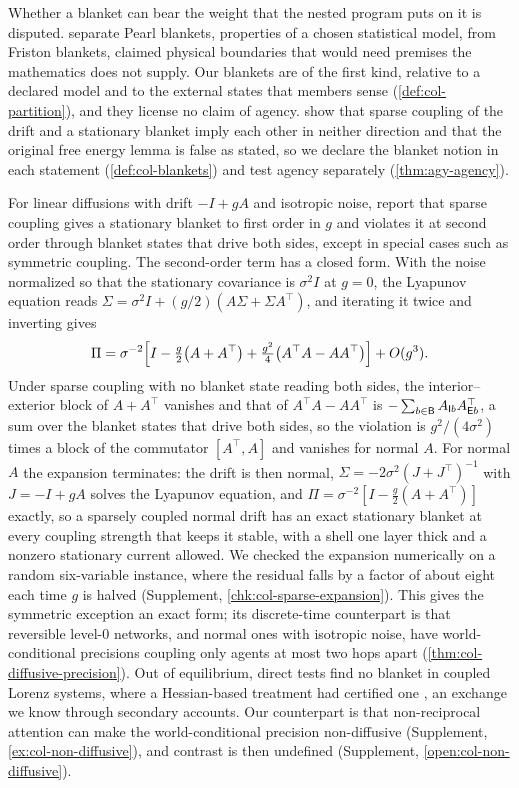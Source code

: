Whether a blanket can bear the weight that the nested program puts on it is disputed. \citet{bruineberg2022emperors} separate Pearl blankets, properties of a chosen statistical model, from Friston blankets, claimed physical boundaries that would need premises the mathematics does not supply. Our blankets are of the first kind, relative to a declared model and to the external states that members sense (\cref{def:col-partition}), and they license no claim of agency. \citet{biehl2021technical} show that sparse coupling of the drift and a stationary blanket imply each other in neither direction and that the original free energy lemma is false as stated, so we declare the blanket notion in each statement (\cref{def:col-blankets}) and test agency separately (\cref{thm:agy-agency}).

For linear diffusions with drift $-I+gA$ and isotropic noise, \citet{aguilera2022particular} report that sparse coupling gives a stationary blanket to first order in $g$ and violates it at second order through blanket states that drive both sides, except in special cases such as symmetric coupling. The second-order term has a closed form. With the noise normalized so that the stationary covariance is $\sigma^2I$ at $g=0$, the Lyapunov equation reads $\Sigma=\sigma^2I+(g/2)(A\Sigma+\Sigma A^\top)$, and iterating it twice and inverting gives
\[
\Pi=\sigma^{-2}\Bigl[I-\tfrac{g}{2}\bigl(A+A^\top\bigr)+\tfrac{g^{2}}{4}\bigl(A^\top A-AA^\top\bigr)\Bigr]+O(g^{3}).
\]
Under sparse coupling with no blanket state reading both sides, the interior--exterior block of $A+A^\top$ vanishes and that of $A^\top A-AA^\top$ is $-\sum_{b\in\mathsf{B}}A_{\mathsf{I} b}A_{\mathsf{E} b}^\top$, a sum over the blanket states that drive both sides, so the violation is $g^2/(4\sigma^2)$ times a block of the commutator $[A^\top,A]$ and vanishes for normal $A$. For normal $A$ the expansion terminates: the drift is then normal, $\Sigma=-2\sigma^2(J+J^\top)^{-1}$ with $J=-I+gA$ solves the Lyapunov equation, and $\Pi=\sigma^{-2}[I-\frac g2(A+A^\top)]$ exactly, so a sparsely coupled normal drift has an exact stationary blanket at every coupling strength that keeps it stable, with a shell one layer thick and a nonzero stationary current allowed. We checked the expansion numerically on a random six-variable instance, where the residual falls by a factor of about eight each time $g$ is halved (Supplement, \cref{chk:col-sparse-expansion}). This gives the symmetric exception an exact form; its discrete-time counterpart is that reversible level-0 networks, and normal ones with isotropic noise, have world-conditional precisions coupling only agents at most two hops apart (\cref{thm:col-diffusive-precision}). Out of equilibrium, direct tests find no blanket in coupled Lorenz systems, where a Hessian-based treatment had certified one \citep{friston2021stochastic,aguilera2023knitting,aguilera2023confederation}, an exchange we know through secondary accounts. Our counterpart is that non-reciprocal attention can make the world-conditional precision non-diffusive (Supplement, \cref{ex:col-non-diffusive}), and contrast is then undefined (Supplement, \cref{open:col-non-diffusive}).

